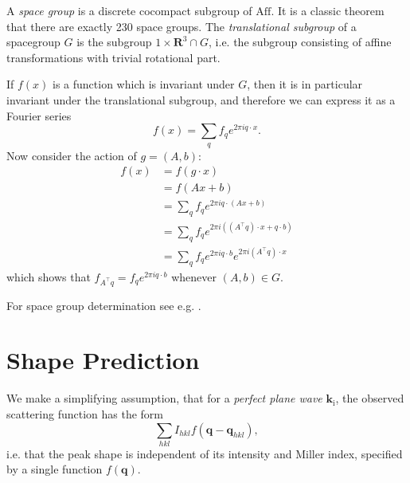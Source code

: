 \documentclass[11pt,a4paper]{article}
\def\v#1{\bm{{#1}}}
\def\tr{^\intercal}
\def\si{\text{i}}
\def\k{{\v{k}}}
\def\q{{\v{q}}}
\begin{document}
A \emph{space group} is a discrete cocompact subgroup of $\mathrm{Aff}$. It is a classic theorem that there are exactly 230 space groups.
The \emph{translational subgroup} of a spacegroup $G$ is the subgroup ${1} \times \mathbf{R}^3 \cap G$, i.e. the subgroup consisting of
affine transformations with trivial rotational part.

If $f(x)$ is a function which is invariant under $G$, then it
is in particular invariant under the translational subgroup, and therefore we can express it as a Fourier series
\begin{equation} f(x) = \sum_q f_q e^{2\pi i q \cdot x}. \end{equation}
Now consider the action of $g = (A,b)$:
\begin{align}
  f(x)
  &= f(g\cdot x) \\
  &= f(Ax + b) \\
  &= \sum_q f_q e^{2\pi i q \cdot (Ax + b)} \\
  &= \sum_q f_q e^{2\pi i ((A\tr q) \cdot x + q \cdot b)} \\
  &= \sum_q f_q e^{2 \pi i q \cdot b} e^{2\pi i (A\tr q) \cdot x}
\end{align}
which shows that $f_{A\tr q} = f_{q} e^{2 \pi i q \cdot b}$ whenever $(A,b) \in G$.


For space group determination see e.g. \cite{Eva11,Kab10b}.


\section{Shape Prediction} \label{peak-prediction}

We make a simplifying assumption, that for a \emph{perfect plane wave} $\k_\si$, the observed scattering function has the form
\begin{equation} \sum_{hkl} I_{hkl} f(\q - \q_{hkl}), \end{equation}
i.e. that the peak shape is independent of its intensity and Miller index, specified by a single function $f(\q)$.
\end{document}
